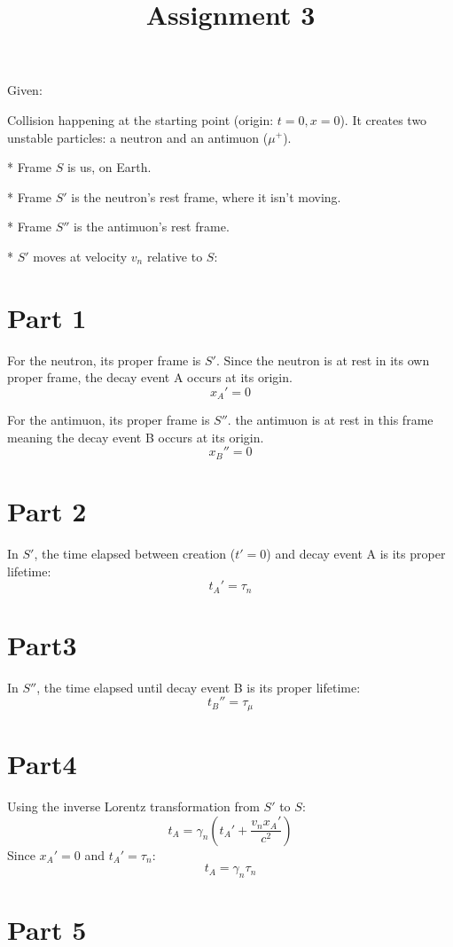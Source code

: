 \documentclass{article}
\title{Assignment 3}
\begin{document}
\setlength{\parindent}{0pt}
\maketitle

Given:

Collision happening at the starting point (origin: $t=0, x=0$). It creates two unstable particles: a neutron and an antimuon ($\mu^+$).  

* Frame $S$ is us, on Earth.  

* Frame $S'$ is the neutron's rest frame, where it isn't moving. 

* Frame $S''$ is the antimuon's rest frame.  

* $S'$ moves at velocity $v_n$ relative to $S$:


\section{Part 1}

For the neutron, its proper frame is $S'$. Since the neutron is at rest in its own proper frame, the decay event A occurs at its origin.
$$x_A' = 0$$

For the antimuon, its proper frame is $S''$. the antimuon is at rest in this frame meaning the decay event B occurs at its origin.
$$x_B'' = 0$$

\section{Part 2}
In $S'$, the time elapsed between creation ($t'=0$) and decay event A is its proper lifetime:
$$t_A' = \tau_n$$

\section{Part3}

In $S''$, the time elapsed until decay event B is its proper lifetime:
$$t_B'' = \tau_\mu$$

\section{Part4}

Using the inverse Lorentz transformation from $S'$ to $S$:
$$t_A = \gamma_n (t_A' + \frac{v_n x_A'}{c^2})$$
Since $x_A' = 0$ and $t_A' = \tau_n$:
$$t_A = \gamma_n \tau_n$$

\section{Part 5}
\end{document}
